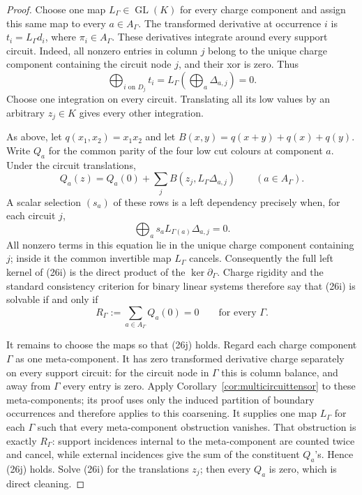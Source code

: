 \documentclass[11pt]{article}
\theoremstyle{definition}
\theoremstyle{remark}
\begin{document}
\begin{proof}
Choose one map $L_\Gamma\in\operatorname{GL}(K)$ for every charge
component and assign this same map to every $a\in A_\Gamma$.  The
transformed derivative at occurrence $i$ is
$t_i=L_\Gamma d_i$, where $\pi_i\in A_\Gamma$.  These derivatives
integrate around every support circuit.  Indeed, all nonzero entries in
column $j$ belong to the unique charge component containing the circuit
node $j$, and their xor is zero.  Thus
\[
 \bigoplus_{i\text{ on }D_j}t_i
 =L_\Gamma\left(\bigoplus_a\Delta_{a,j}\right)=0.
\]
Choose one integration on every circuit.  Translating all its low values
by an arbitrary $z_j\in K$ gives every other integration.

As above, let $q(x_1,x_2)=x_1x_2$ and let
$B(x,y)=q(x+y)+q(x)+q(y)$.  Write $Q_a$ for the common parity of the four
low cut colours at component $a$.  Under the circuit translations,
\[
 Q_a(z)=Q_a(0)+\sum_j B(z_j,L_\Gamma\Delta_{a,j})
 \qquad(a\in A_\Gamma).                                  \tag{26i}
\]
A scalar selection $(s_a)$ of these rows is a left dependency precisely
when, for each circuit $j$,
\[
             \bigoplus_a s_aL_{\Gamma(a)}\Delta_{a,j}=0.
\]
All nonzero terms in this equation lie in the unique charge component
containing $j$; inside it the common invertible map $L_\Gamma$ cancels.
Consequently the full left kernel of (26i) is the direct product of the
$\ker\partial_\Gamma$.  Charge rigidity and the standard consistency
criterion for binary linear systems therefore say that (26i) is solvable
if and only if
\[
             R_\Gamma:=\sum_{a\in A_\Gamma}Q_a(0)=0
             \qquad\text{for every }\Gamma.             \tag{26j}
\]

It remains to choose the maps so that (26j) holds.  Regard each charge
component $\Gamma$ as one meta-component.  It has zero transformed
derivative charge separately on every support circuit: for the circuit
node in $\Gamma$ this is column balance, and away from $\Gamma$ every
entry is zero.  Apply Corollary~\ref{cor:multicircuittensor} to these
meta-components; its proof uses only the induced partition of boundary
occurrences and therefore applies to this coarsening.  It supplies one
map $L_\Gamma$ for each $\Gamma$ such
that every meta-component obstruction vanishes.  That obstruction is
exactly $R_\Gamma$: support incidences internal to the meta-component are
counted twice and cancel, while external incidences give the sum of the
constituent $Q_a$'s.  Hence (26j) holds.  Solve (26i) for the translations
$z_j$; then every $Q_a$ is zero, which is direct cleaning.
\end{proof}
\end{document}
